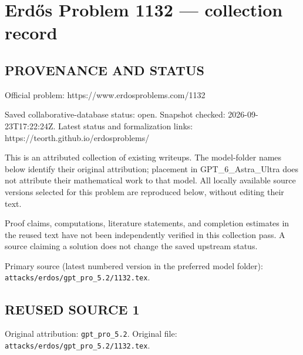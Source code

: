 \section*{Erd\H{o}s Problem 1132 --- collection record}

\subsection*{PROVENANCE AND STATUS}
Official problem: https://www.erdosproblems.com/1132

Saved collaborative-database status: open.
Snapshot checked: 2026-09-23T17:22:24Z.
Latest status and formalization links: https://teorth.github.io/erdosproblems/

This is an attributed collection of existing writeups. The model-folder names below identify their original attribution; placement in GPT\_6\_Astra\_Ultra does not attribute their mathematical work to that model. All locally available source versions selected for this problem are reproduced below, without editing their text.

Proof claims, computations, literature statements, and completion estimates in the reused text have not been independently verified in this collection pass. A source claiming a solution does not change the saved upstream status.

Primary source (latest numbered version in the preferred model folder): \texttt{attacks/erdos/gpt\_pro\_5.2/1132.tex}.

\subsection*{REUSED SOURCE 1}
Original attribution: \texttt{gpt\_pro\_5.2}.
Original file: \texttt{attacks/erdos/gpt\_pro\_5.2/1132.tex}.


